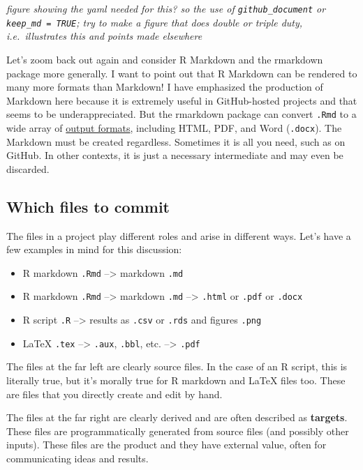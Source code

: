 \documentclass[12pt]{article}
\providecommand{\tightlist}{%
  \setlength{\itemsep}{0pt}\setlength{\parskip}{0pt}}
\begin{document}
\emph{figure showing the yaml needed for this? so the use of
\texttt{github\_document} or \texttt{keep\_md\ =\ TRUE}; try to make a
figure that does double or triple duty, i.e.~illustrates this and points
made elsewhere}

Let's zoom back out again and consider R Markdown and the rmarkdown
package more generally. I want to point out that R Markdown can be
rendered to many more formats than Markdown! I have emphasized the
production of Markdown here because it is extremely useful in
GitHub-hosted projects and that seems to be underappreciated. But the
rmarkdown package can convert \texttt{.Rmd} to a wide array of
\href{http://rmarkdown.rstudio.com/lesson-9.html}{output formats},
including HTML, PDF, and Word (\texttt{.docx}). The Markdown must be
created regardless. Sometimes it is all you need, such as on GitHub. In
other contexts, it is just a necessary intermediate and may even be
discarded.

\subsection{Which files to commit}\label{which-files-to-commit}

The files in a project play different roles and arise in different ways.
Let's have a few examples in mind for this discussion:

\begin{itemize}
\tightlist
\item
  R markdown \texttt{.Rmd} --\textgreater{} markdown \texttt{.md}
\item
  R markdown \texttt{.Rmd} --\textgreater{} markdown \texttt{.md}
  --\textgreater{} \texttt{.html} or \texttt{.pdf} or \texttt{.docx}
\item
  R script \texttt{.R} --\textgreater{} results as \texttt{.csv} or
  \texttt{.rds} and figures \texttt{.png}
\item
  LaTeX \texttt{.tex} --\textgreater{} \texttt{.aux}, \texttt{.bbl},
  etc. --\textgreater{} \texttt{.pdf}
\end{itemize}

The files at the far left are clearly source files. In the case of an R
script, this is literally true, but it's morally true for R markdown and
LaTeX files too. These are files that you directly create and edit by
hand.

The files at the far right are clearly derived and are often described
as \textbf{targets}. These files are programmatically generated from
source files (and possibly other inputs). These files are the product
and they have external value, often for communicating ideas and results.
\end{document}
